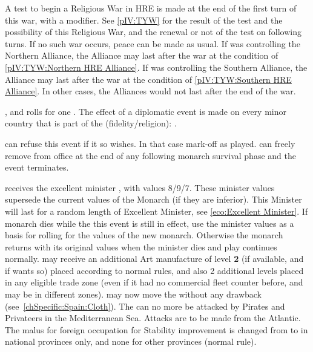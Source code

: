 \phpaix
\aparag A test to begin a Religious War in HRE is made at the end of the first
turn of this war, with a  modifier.  See \ref{pIV:TYW} for the
result of the test and the possibility of this Religious War, and the renewal
or not of the test on following turns.  If no such war occurs, peace can be
made as usual.
\bparag If \HOL was controlling the Northern Alliance, the Alliance may last
after the war at the condition of \ref{pIV:TYW:Northern HRE Alliance}.
\bparag If \MAJHAB was controlling the Southern Alliance, the Alliance may
last after the war at the condition of \ref{pIV:TYW:Southern HRE Alliance}.
\bparag In other cases, the Alliances would not last after the end of the war.




\phevnt
\aparag \AUS, \HOL and \HIS rolls for one \REVOLT .
\aparag The effect of a diplomatic event is made on every minor country that
is part of the \HRE (fidelity/religion):
.





\condition{}
\aparag \SPA can refuse this event if it so wishes. In that case mark-off as
played.
\aparag \SPA can freely remove  from office at the end of
any following monarch survival phase and the event terminates.

\phevnt
\aparag \SPA receives the excellent minister , with values
8/9/7.  These minister values supersede the current values of the Monarch (if
they are inferior). This Minister will last for a random length of Excellent
Minister, see \ref{eco:Excellent Minister}.
\aparag If \SPA monarch dies while the this event is still in effect, use the
minister values as a basis for rolling for the values of the new
monarch. Otherwise the monarch returns with its original values when the
minister dies and play continues normally.
\aparag \SPA may receive an additional Art manufacture of level {\bf 2} (if
available, and if \SPA wants so) placed according to normal rules, and also 2
additional \TradeFLEET levels placed in any eligible trade zone (even if it
had no \SPA commercial fleet counter before, and may be in different zones).
\bparag \SPA may now move the  \MNU without any drawback
(see~\ref{chSpecific:Spain:Cloth}).
\aparag The  can no more be attacked by Pirates and Privateers in
the Mediterranean Sea. Attacks are to be made from the Atlantic.
\aparag The malus for foreign occupation for Stability improvement is changed
from  to  in national provinces only, and none for other
provinces (normal rule).

